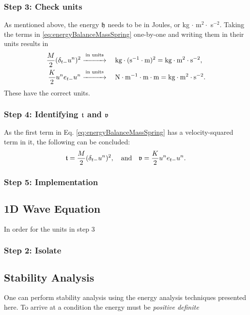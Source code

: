 {{\subsubsection{Step 3: Check units}
As mentioned above, the energy $\mathfrak{h}$ needs to be in Joules, or kg $\cdot$ m$^2 \cdot$ s$^{-2}$. Taking the terms in \eqref{eq:energyBalanceMassSpring} one-by-one and writing them in their units results in 
\begin{align*}
    \frac{M}{2}(\delta_{t-}u^n)^2 &\overset{\text{in units}}{\xrightarrow{\hspace*{1cm}}} \quad\text{kg}\cdot(\text{s}^{-1}\cdot \text{m})^{2}= \text{kg}\cdot\text{m}^2\cdot\text{s}^{-2},\\
    \frac{K}{2}u^n e_{t-}u^n&\overset{\text{in units}}{\xrightarrow{\hspace*{1cm}}} \quad \text{N} \cdot \text{m}^{-1} \cdot \text{m}\cdot \text{m} = \text{kg}\cdot\text{m}^2\cdot\text{s}^{-2}.
\end{align*}
These have the correct units. 

\subsubsection{Step 4: Identifying $\mathfrak{t}$ and $\mathfrak{v}$}
As the first term in Eq. \eqref{eq:energyBalanceMassSpring} has a velocity-squared term in it, the following can be concluded:
\begin{equation}
    \mathfrak{t} = \frac{M}{2}(\delta_{t-}u^n)^2, \quad \text{and} \quad \mathfrak{v} = \frac{K}{2}u^n e_{t-}u^n.
\end{equation} 
\subsubsection{Step 5: Implementation}


\subsection{1D Wave Equation}
In order for the units in step 3

\subsubsection{Step 2: Isolate}

\subsection{Stability Analysis}
One can perform stability analysis using the energy analysis techniques presented here. To arrive at a condition the energy must be \textit{positive definite} 

}}
